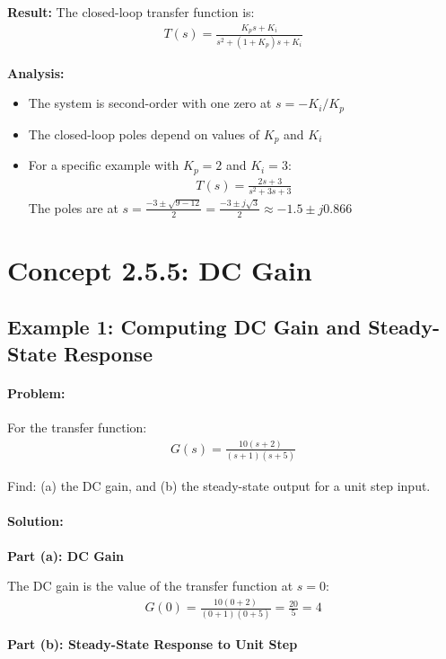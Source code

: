 \documentclass[11pt,a4paper]{article}
\begin{document}
\textbf{Result:} The closed-loop transfer function is:
\begin{align}
T(s) = \frac{K_ps + K_i}{s^2 + (1+K_p)s + K_i}
\end{align}

\textbf{Analysis:}
\begin{itemize}
\item The system is second-order with one zero at $s = -K_i/K_p$
\item The closed-loop poles depend on values of $K_p$ and $K_i$
\item For a specific example with $K_p = 2$ and $K_i = 3$:
\begin{align}
T(s) = \frac{2s + 3}{s^2 + 3s + 3}
\end{align}
The poles are at $s = \frac{-3 \pm \sqrt{9-12}}{2} = \frac{-3 \pm j\sqrt{3}}{2} \approx -1.5 \pm j0.866$
\end{itemize}

\section{Concept 2.5.5: DC Gain}

\subsection{Example 1: Computing DC Gain and Steady-State Response}

\paragraph{Problem:} For the transfer function:
\begin{align}
G(s) = \frac{10(s+2)}{(s+1)(s+5)}
\end{align}

Find: (a) the DC gain, and (b) the steady-state output for a unit step input.

\paragraph{Solution:}

\textbf{Part (a): DC Gain}

The DC gain is the value of the transfer function at $s = 0$:
\begin{align}
G(0) = \frac{10(0+2)}{(0+1)(0+5)} = \frac{20}{5} = 4
\end{align}

\textbf{Part (b): Steady-State Response to Unit Step}
\end{document}
